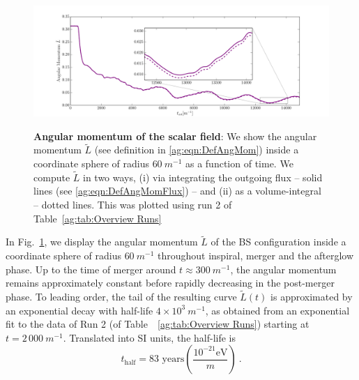\begin{figure}[h!]
\begin{center}
{\includegraphics[width=1.0\columnwidth]{ag_fig/ang_integrated_flux_with_radius_60}}
\caption{
    {\bf Angular momentum of the scalar field}: We show the angular
    momentum $\tilde{L}$ (see definition in  \ref{ag:eqn:DefAngMom}) inside a coordinate sphere of radius $60~m^{-1}$ as a function of time. We compute
    $\tilde{L}$ in two ways, (i) via integrating the outgoing flux -- solid lines (see \ref{ag:eqn:DefAngMomFlux}) -- and (ii) as a volume-integral --
    dotted lines. This was plotted using run 2 of Table~\ref{ag:tab:Overview
    Runs}}
\label{ag:fig:AngMom}
\end{center}
\end{figure}
In Fig.~\ref{ag:fig:AngMom}, we display
the angular momentum $\tilde{L}$ of the BS configuration
inside a coordinate sphere of radius $60~m^{-1}$ throughout
inspiral, merger and the afterglow phase. Up to the time
of merger around $t\approx 300~m^{-1}$, the angular momentum
remains approximately constant before rapidly decreasing
in the post-merger phase. To leading order,
the tail of the resulting curve
$\tilde{L}(t)$ is approximated by an exponential decay with
half-life $4\times10^3~m^{-1}$, as obtained from an exponential
fit to the data of Run 2 (of Table~~\ref{ag:tab:Overview Runs}) starting at $t=2\,000~m^{-1}$.
Translated into SI units, the half-life is
\begin{equation}
    t_{\text{half}} = 83 \text{ years}  \left(\frac{10^{-21}
    \text{eV}}{m}\right)~\label{ag:eqn:decay_time}.
\end{equation}


